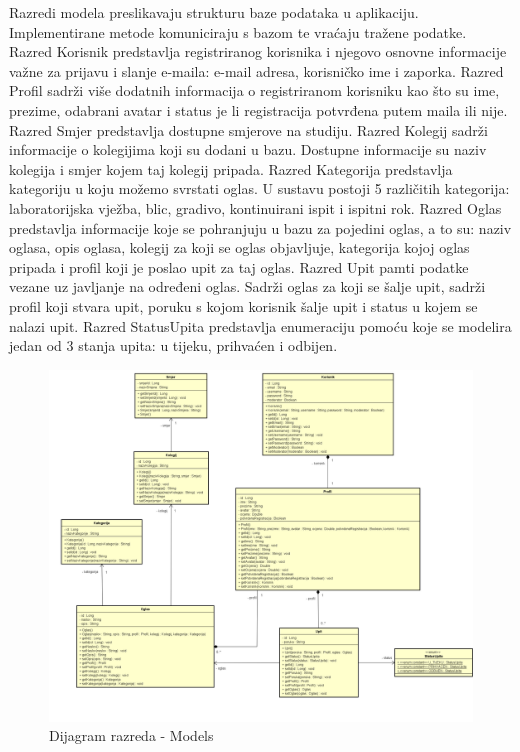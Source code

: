 			Razredi modela preslikavaju strukturu baze podataka u aplikaciju. Implementirane metode komuniciraju s bazom te vraćaju tražene podatke. Razred Korisnik predstavlja registriranog korisnika i njegovo osnovne informacije važne za prijavu i slanje e-maila: e-mail adresa, korisničko ime i zaporka. Razred Profil sadrži više dodatnih informacija o registriranom korisniku kao što su ime, prezime, odabrani avatar i status je li registracija potvrđena putem maila ili nije. Razred Smjer predstavlja dostupne smjerove na studiju. Razred Kolegij sadrži informacije o kolegijima koji su dodani u bazu. Dostupne informacije su naziv kolegija i smjer kojem taj kolegij pripada. Razred Kategorija predstavlja kategoriju u koju možemo svrstati oglas. U sustavu postoji 5 različitih kategorija: laboratorijska vježba, blic, gradivo, kontinuirani ispit i ispitni rok. Razred Oglas predstavlja informacije koje se pohranjuju u bazu za pojedini oglas, a to su: naziv oglasa, opis oglasa, kolegij za koji se oglas objavljuje, kategorija kojoj oglas pripada i profil koji je poslao upit za taj oglas. Razred Upit pamti podatke vezane uz javljanje na određeni oglas. Sadrži oglas za koji se šalje upit, sadrži profil koji stvara upit, poruku s kojom korisnik šalje upit i status u kojem se nalazi upit. Razred StatusUpita predstavlja enumeraciju pomoću koje se modelira jedan od 3 stanja upita: u tijeku, prihvaćen i odbijen.
			
			\begin{figure}[H]
				\includegraphics[scale=0.28]{dijagrami/dijagram_razreda_models.png}
				\centering
				\caption{Dijagram razreda - Models}
				\label{fig:models}
			\end{figure}
		
